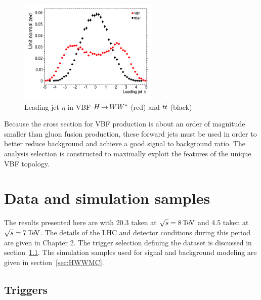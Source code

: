 \begin{figure}
  \vspace{20pt}
  \centering
  \hspace*{-32pt}
  \includegraphics[width=0.6\textwidth]{figures/VBF_LeadJetEta}
  \caption{Leading jet $\eta$ in VBF $H{\,{\rightarrow}\,}WW^\ast$ (red) and $t\bar{t}$ (black)}
  \label{fig:VBF_LeadJetEta}
\end{figure}

Because the cross section for VBF production is about an order of magnitude smaller than gluon fusion production, these forward jets must be used in order to better reduce background and achieve a good signal to background ratio. The analysis selection is constructed to maximally exploit the features of the unique VBF topology. 

\section{Data and simulation samples}

The results presented here are with 20.3 \ifb taken at $\sqrt{s} = 8 \TeV$ and 4.5 \ifb taken at $\sqrt{s} = 7 \TeV$. The details of the LHC and detector conditions during this period are given in Chapter 2. The trigger selection defining the dataset is discussed in section~\ref{sec:HWWtrigger}. The simulation samples used for signal and background modeling are given in section~\ref{sec:HWWMC}.

\subsection{Triggers}
\label{sec:HWWtrigger}

